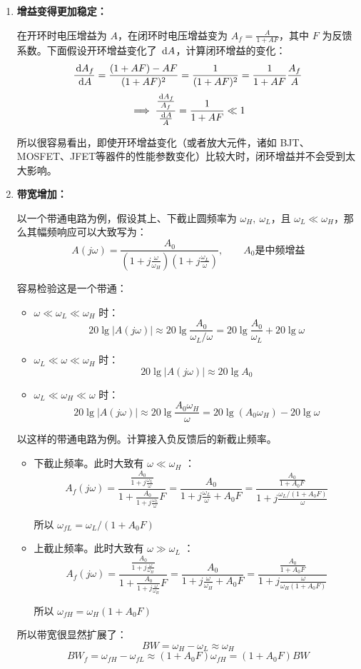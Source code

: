 \documentclass[a4paper,11pt,UTF8]{ctexart}
\newcommand{\p}{\par}
\newcommand\dd{\thinspace\mathrm{d}}
\begin{document}
\begin{enumerate}
 \item\textbf{增益变得更加稳定：}
 \p 在开环时电压增益为 $A$，在闭环时电压增益变为 $A_f=\frac{A}{1+AF}$，其中 $F$ 为反馈系数。下面假设开环增益变化了 $\dd{A}$，计算闭环增益的变化：
 \[ \frac{\dd{A_f}}{\dd{A}}=\frac{(1+AF)-AF}{(1+AF)^2}
 =\frac{1}{(1+AF)^2}
 =\frac{1}{1+AF}\frac{A_f}{A} \]
 \[ \implies \frac{\frac{\dd{A_f}}{A_f}}{\frac{\dd{A}}{A}}
 =\frac{1}{1+AF}\ll1 \]
 \p 所以很容易看出，即使开环增益变化（或者放大元件，诸如 BJT、MOSFET、JFET等器件的性能参数变化）比较大时，闭环增益并不会受到太大影响。
 
 \item\textbf{带宽增加：}
 \p 以一个带通电路为例，假设其上、下截止圆频率为 $\omega_H,~\omega_L$，且 $\omega_L\ll\omega_H$，那么其幅频响应可以大致写为：
 \[ A(j\omega)=\frac{A_0}{\left( 1+j\frac{\omega}{\omega_H} \right)
 \left( 1+j\frac{\omega_L}{\omega} \right)},\qquad A_0\text{是中频增益} \]
 \p 容易检验这是一个带通：
 \begin{itemize}
  \item $\omega\ll\omega_L\ll\omega_H$ 时：
	 \[20\lg|A(j\omega)|\approx 20\lg\frac{A_0}{\omega_L/\omega}
	 =20\lg\frac{A_0}{\omega_L}+20\lg\omega \]
	\item $\omega_L\ll\omega\ll\omega_H$ 时：
	 \[20\lg|A(j\omega)|\approx 20\lg A_0 \]
	\item $\omega_L\ll\omega_H\ll\omega$ 时：
	 \[20\lg|A(j\omega)|\approx 20\lg\frac{A_0\omega_H}{\omega}
	 =20\lg{(A_0\omega_H)}-20\lg\omega \]
 \end{itemize}
 \p 以这样的带通电路为例。计算接入负反馈后的新截止频率。
 \begin{itemize}
  \item 下截止频率。此时大致有 $\omega\ll\omega_H$ ：
  \[ A_f(j\omega)=\frac{\frac{A_0}{1+j\frac{\omega_L}{\omega}}}
  {1+\frac{A_0}{1+j\frac{\omega_L}{\omega}}F}
  =\frac{A_0}{1+j\frac{\omega_L}{\omega}+A_0F }
  =\frac{ \frac{A_0}{1+A_0F} }
  { 1+j\frac{\omega_L/(1+A_0F)}{\omega} }
  \]
  \p 所以 $\omega_{fL}=\omega_L/(1+A_0F)$
  \item 上截止频率。此时大致有 $\omega\gg\omega_L$ ：
  \[ A_f(j\omega)=\frac{\frac{A_0}{1+j\frac{\omega}{\omega_H}}}
  {1+\frac{A_0}{1+j\frac{\omega}{\omega_H}}F}
  =\frac{A_0}{1+j\frac{\omega}{\omega_H}+A_0F }
  =\frac{ \frac{A_0}{1+A_0F} }
  { 1+j\frac{\omega}{\omega_H(1+A_0F)} }
  \]
  \p 所以 $\omega_{fH}=\omega_H(1+A_0F)$
 \end{itemize}
 \p 所以带宽很显然扩展了：
 \[ BW=\omega_H-\omega_L\approx\omega_H \]
 \[ BW_f=\omega_{fH}-\omega_{fL}\approx(1+A_0F)\omega_{fH}
 =(1+A_0F)BW \]
 

\end{enumerate}
\end{document}
